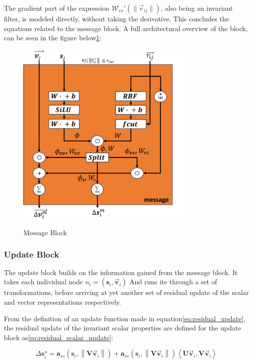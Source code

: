 The gradient part of the expression $\mathcal{W}_{vs}'(\lVert \vec{r}_{ij} \rVert)$, also being an invariant filter, is modeled directly,
without taking the derivative\cite{PAINN}. This concludes the equations related to the message block. A full architectural overview
of the block, can be seen in the figure below\ref{img:message_block}:

\begin{figure}[H]
    \caption{Message Block}
    \centering\label{img:message_block}
    \includegraphics[width=250pt]{Images/Method/message_block.png}
\end{figure}

\subsubsection{Update Block}\label{subsubsec:update_block}

The update block builds on the information gained from the message block. It takes each individual node $n_{i} = (\mathbf{s}_{i}, \vec{\mathbf{v}}_{i})$
And runs ite through a set of transformations, before arriving at yet another set of residual update of the scalar and vector
representations respectively.

From the definition of an update function made in equation\ref{eq:residual_update}, the residual update of the invariant scalar properties
are defined for the update block as\ref{eq:residual_scalar_update}:

\begin{equation}\label{eq:residual_scalar_update}
    \Delta \mathbf{s}_{i}^{u}= \mathbf{a}_{ss} \left ( \mathbf{s}_{i}, \left \| \mathbf{V}\vec{\mathbf{v}}_{i} \right \| \right ) + \mathbf{a}_{sv} \left ( \mathbf{s}_{i}, \left \| \mathbf{V}\vec{\mathbf{v}}_{i} \right \| \right ) \left \langle \mathbf{U} \vec{\mathbf{v}}_{i}, \mathbf{V} \vec{\mathbf{v}}_{i} \right \rangle
\end{equation}

